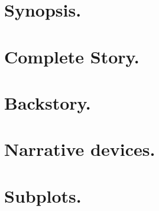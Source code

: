 \documentclass[a4]{report}
\begin{document}
	\chapter{Synopsis.}
	
	\chapter{Complete Story.}
	
	\chapter{Backstory.}
	
	\chapter{Narrative devices.}
	
	\chapter{Subplots.}
	
	
	
\end{document}

